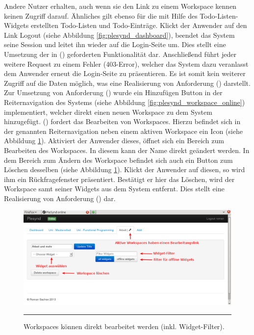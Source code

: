 Andere Nutzer erhalten, auch wenn sie den Link zu einem Workspace kennen keinen Zugriff darauf. Ähnliches gilt ebenso für die mit Hilfe des Todo-Listen-Widgets erstellten Todo-Listen und Todo-Einträge.
Klickt der Anwender auf den Link Logout (siehe Abbildung \ref{fig:plesynd_dashboard}), beendet das System seine Session und leitet ihn wieder auf die Login-Seite um. Dies stellt eine Umsetzung der in  (\emph{\requirementLogout}) geforderten Funktionalität dar. Anschließend führt jeder weitere Request zu einem Fehler (403-Error), welcher das System dazu veranlasst dem Anwender erneut die Login-Seite zu präsentieren. Es ist somit kein weiterer Zugriff auf die Daten möglich, was eine Realisierung von Anforderung  (\emph{\requirementKeinZugriffNachLogout}) darstellt. Zur Umsetzung von Anforderung  (\emph{\requirementWorkspaceAdd}) wurde ein Hinzufügen Button in der Reiternavigation des Systems (siehe Abbildung \ref{fig:plesynd_workspace_online}) implementiert, welcher direkt einen neuen Workspace zu dem System hinzugefügt.
 (\emph{\requirementWorkspaceEdit}) fordert das Bearbeiten von Workspaces. Hierzu befindet sich in der genannten Reiternavigation neben einem aktiven Workspace ein Icon (siehe Abbildung \ref{fig:plesynd_workspace_edit}). Aktiviert der Anwender dieses, öffnet sich ein Bereich zum Bearbeiten des Workspaces. In diesem kann der Name direkt geändert werden. In dem Bereich zum Ändern des Workspace befindet sich auch ein Button zum Löschen desselben (siehe Abbildung \ref{fig:plesynd_workspace_edit}).
Klickt der Anwender auf diesen, so wird ihm ein Rückfragefenster präsentiert. Bestätigt er hier das Löschen, wird der Workspace samt seiner Widgets aus dem System entfernt. Dies stellt eine Realisierung von Anforderung  (\emph{\requirementWorkspaceDelete}) dar.
\begin{figure}[H]
  \centering
  \includegraphics[width=\textwidth]{./Figures/plesynd_workspace_edit.png}
    \rule{35em}{0.5pt}
  \caption[Plesynd User"=Interface: Bearbeiten von Workspaces]{Workspaces können direkt bearbeitet werden (inkl. Widget-Filter).}
  \label{fig:plesynd_workspace_edit}
\end{figure}


